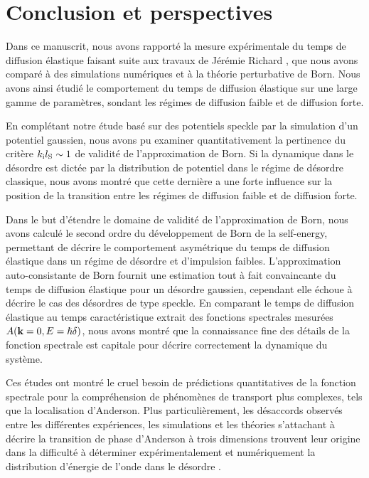 
\chapter{Conclusion et perspectives}

Dans ce manuscrit, nous avons rapporté la mesure expérimentale du temps de diffusion élastique faisant suite aux travaux de Jérémie Richard \citep{richard2015propagation}, que nous avons comparé à des simulations numériques et à la théorie perturbative de Born. Nous avons ainsi étudié le comportement du temps de diffusion élastique sur une large gamme de paramètres, sondant les régimes de diffusion faible et de diffusion forte.  

En complétant notre étude basé sur des potentiels speckle par la simulation d'un potentiel gaussien, nous avons pu examiner quantitativement la pertinence du critère $k_{\mathrm{i}}l_{\mathrm{S}}\sim 1$ de validité de l'approximation de Born. Si la dynamique dans le désordre est dictée par la distribution de potentiel dans le régime de désordre classique, nous avons montré que cette dernière a une forte influence sur la position de la transition entre les régimes de diffusion faible et de diffusion forte. 

Dans le but d'étendre le domaine de validité de l'approximation de Born, nous avons calculé le second ordre du développement de Born de la self-energy, permettant de décrire le comportement asymétrique du temps de diffusion élastique dans un régime de désordre et d'impulsion faibles. L'approximation auto-consistante de Born fournit une estimation tout à fait convaincante du temps de diffusion élastique pour un désordre gaussien, cependant elle échoue à décrire le cas des désordres de type speckle. En comparant le temps de diffusion élastique au temps caractéristique extrait des fonctions spectrales mesurées $A(\mathbf{k}=0,E=\hslash\delta)$, nous avons montré que la connaissance fine des détails de la fonction spectrale est capitale pour décrire correctement la dynamique du système. 

Ces études ont montré le cruel besoin de prédictions quantitatives de la fonction spectrale pour la compréhension de phénomènes de transport plus complexes, tels que la localisation d'Anderson. Plus particulièrement, les désaccords observés entre les différentes expériences, les simulations et les théories s'attachant à décrire la transition de phase d'Anderson à trois dimensions trouvent leur origine dans la difficulté à déterminer expérimentalement et numériquement la distribution d'énergie de l'onde dans le désordre \citep{pasek2017anderson}.









